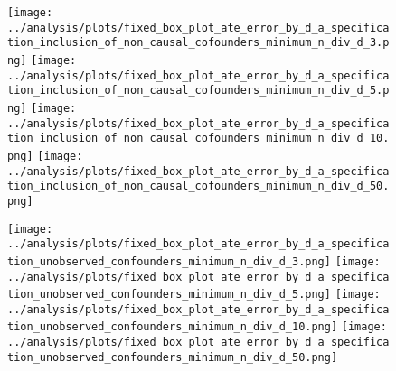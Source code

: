 \documentclass{article}
\numberwithin{equation}{section}
\begin{document}
\begin{figure}[H]
    \centering
    \texttt{[image: ../analysis/plots/fixed\_box\_plot\_ate\_error\_by\_d\_a\_specification\_inclusion\_of\_non\_causal\_cofounders\_minimum\_n\_div\_d\_3.png]}
    \texttt{[image: ../analysis/plots/fixed\_box\_plot\_ate\_error\_by\_d\_a\_specification\_inclusion\_of\_non\_causal\_cofounders\_minimum\_n\_div\_d\_5.png]}
    \texttt{[image: ../analysis/plots/fixed\_box\_plot\_ate\_error\_by\_d\_a\_specification\_inclusion\_of\_non\_causal\_cofounders\_minimum\_n\_div\_d\_10.png]}
    \texttt{[image: ../analysis/plots/fixed\_box\_plot\_ate\_error\_by\_d\_a\_specification\_inclusion\_of\_non\_causal\_cofounders\_minimum\_n\_div\_d\_50.png]}
\end{figure}
\begin{figure}[H]
    \centering
    \texttt{[image: ../analysis/plots/fixed\_box\_plot\_ate\_error\_by\_d\_a\_specification\_unobserved\_confounders\_minimum\_n\_div\_d\_3.png]}
    \texttt{[image: ../analysis/plots/fixed\_box\_plot\_ate\_error\_by\_d\_a\_specification\_unobserved\_confounders\_minimum\_n\_div\_d\_5.png]}
    \texttt{[image: ../analysis/plots/fixed\_box\_plot\_ate\_error\_by\_d\_a\_specification\_unobserved\_confounders\_minimum\_n\_div\_d\_10.png]}
    \texttt{[image: ../analysis/plots/fixed\_box\_plot\_ate\_error\_by\_d\_a\_specification\_unobserved\_confounders\_minimum\_n\_div\_d\_50.png]}
\end{figure}
\end{document}

